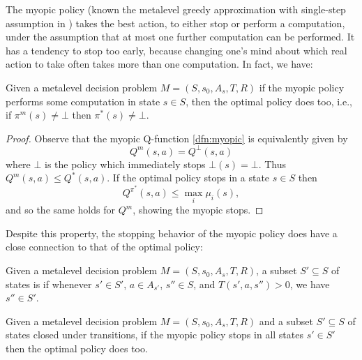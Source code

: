 The myopic policy (known the metalevel greedy approximation with single-step
assumption in \cite{Russell+Wefald:1991a}) takes the best action, to either stop or perform a computation,
under the assumption that at most one further computation can be performed.
It has a tendency to stop too early, because changing one's mind about which real action to take often takes more than one computation.
In fact, we have:

	
\begin{thm}\label{thm:optimal-myopic}
	Given a metalevel decision problem $M=(S,s_0,A_s,T,R)$
	if the myopic policy performs some computation in state $s\in S$,
	then the optimal policy does too, i.e., if $\pi^m(s)\neq\bot$ then $\pi^*(s)\neq\bot$.
\end{thm}

\begin{hiddenproof}
	\begin{proof}
		Observe that the myopic Q-function \eqref{dfn:myopic} is equivalently given by
		\[
			Q^m(s,a) = Q^\bot(s,a)
		\]
		where $\bot$ is the policy which immediately stops $\bot(s)=\bot$.
		Thus $Q^m(s,a) \le Q^*(s,a)$.  If the optimal policy stops in a state $s\in S$ then
		\[
			Q^{\pi^*}(s,a) \le \max_i \mu_i(s),
		\]
		and so the same holds for $Q^m$, showing the myopic stops.
	\end{proof}
\end{hiddenproof}


Despite this property, the stopping behavior of the myopic policy does
have a close connection to that of the optimal policy:

\begin{dfn}\label{dfn:closed}
	Given a metalevel decision problem $M=(S,s_0,A_s,T,R)$,
	a subset $S'\subseteq S$ of states is 
	if whenever $s'\in S'$, $a\in A_{s'}$, $s''\in S$, and $T(s',a,s'')>0$,
	we have $s''\in S'$.
\end{dfn}

\begin{thm}\label{thm:myopic-optimal}
	Given a metalevel decision problem $M=(S,s_0,A_s,T,R)$
	and a subset $S'\subseteq S$ of states closed under transitions,	
	if the myopic policy stops in all states $s'\in S'$
	then the optimal policy does too.	
\end{thm}

